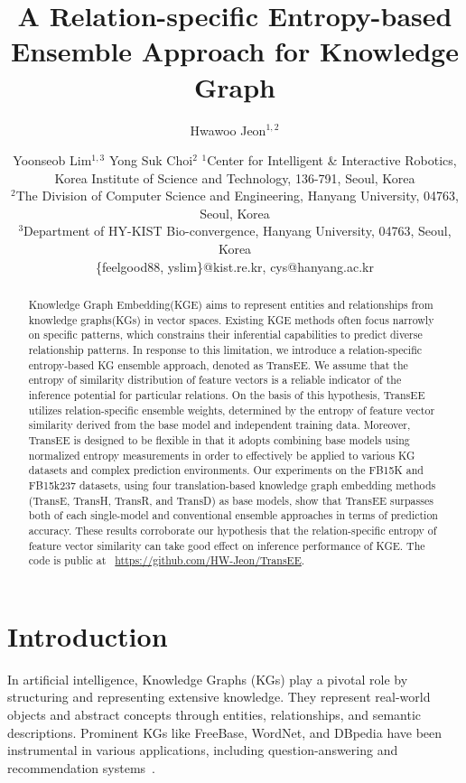 \documentclass{article}
\title{A Relation-specific Entropy-based Ensemble Approach for Knowledge Graph}
\author{
Hwawoo Jeon$^{1,2}$\and
Yoonseob Lim$^{1,3}$\And
Yong Suk Choi$^2$
\affiliations
$^1$Center for Intelligent \& Interactive Robotics\unskip,
Korea Institute of Science and Technology\unskip, 136-791\unskip, Seoul\unskip, Korea\\
$^2$The Division of Computer Science and Engineering\unskip,
Hanyang University\unskip, 04763\unskip, Seoul\unskip, Korea\\
$^3$Department of HY-KIST Bio-convergence\unskip,
Hanyang University\unskip, 04763\unskip, Seoul\unskip, Korea\\
\emails
\{feelgood88, yslim\}@kist.re.kr,
cys@hanyang.ac.kr
}
\begin{document}
\maketitle

\begin{abstract}
    Knowledge Graph Embedding(KGE) aims to represent entities and relationships from knowledge graphs(KGs) in vector spaces. Existing KGE methods often focus narrowly on specific patterns, which constrains their inferential capabilities to predict diverse relationship patterns. In response to this limitation, we introduce a relation-specific entropy-based KG ensemble approach, denoted as TransEE. We assume that the entropy of similarity distribution of feature vectors is a reliable indicator of the inference potential for particular relations. On the basis of this hypothesis, TransEE utilizes relation-specific ensemble weights, determined by the entropy of feature vector similarity derived from the base model and independent training data. Moreover, TransEE is designed to be flexible in that it adopts combining base models using normalized entropy measurements in order to effectively be applied to various KG datasets and complex prediction environments. Our experiments on the FB15K and FB15k237 datasets, using four translation-based knowledge graph embedding methods (TransE, TransH, TransR, and TransD) as base models, show that TransEE surpasses both of each single-model and conventional ensemble approaches in terms of prediction accuracy. These results corroborate our hypothesis that the relation-specific entropy of feature vector similarity can take good effect on inference performance of KGE. The code is public at ~\hyperlink{https://github.com/HW-Jeon/TransEE}{https://github.com/HW-Jeon/TransEE}.

\end{abstract}

\section{Introduction}

In artificial intelligence, Knowledge Graphs (KGs) play a pivotal role by structuring and representing extensive knowledge. They represent real-world objects and abstract concepts through entities, relationships, and semantic descriptions. Prominent KGs like FreeBase, WordNet, and DBpedia have been instrumental in various applications, including question-answering and recommendation systems~\cite{10.1093/bib/bbac481,zheng2021knowledge,chen2021topic}.
\end{document}
